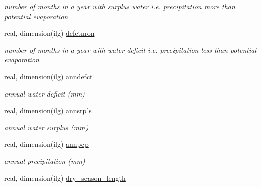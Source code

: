 \begin{DoxyCompactItemize}
\begin{DoxyCompactList}\small\item\em number of months in a year with surplus water i.\+e. precipitation more than potential evaporation \end{DoxyCompactList}\item 
\hypertarget{structctem__statevars_1_1veg__gat_a36f851ca400c9b78f44b675d732a8160}{}real, dimension(ilg) \hyperlink{structctem__statevars_1_1veg__gat_a36f851ca400c9b78f44b675d732a8160}{defctmon}\label{structctem__statevars_1_1veg__gat_a36f851ca400c9b78f44b675d732a8160}

\begin{DoxyCompactList}\small\item\em number of months in a year with water deficit i.\+e. precipitation less than potential evaporation \end{DoxyCompactList}\item 
\hypertarget{structctem__statevars_1_1veg__gat_a1e53f6a1f8f9c68b1e164b30fe833c52}{}real, dimension(ilg) \hyperlink{structctem__statevars_1_1veg__gat_a1e53f6a1f8f9c68b1e164b30fe833c52}{anndefct}\label{structctem__statevars_1_1veg__gat_a1e53f6a1f8f9c68b1e164b30fe833c52}

\begin{DoxyCompactList}\small\item\em annual water deficit (mm) \end{DoxyCompactList}\item 
\hypertarget{structctem__statevars_1_1veg__gat_a78be85930a7e515681ccb43c1d83104c}{}real, dimension(ilg) \hyperlink{structctem__statevars_1_1veg__gat_a78be85930a7e515681ccb43c1d83104c}{annsrpls}\label{structctem__statevars_1_1veg__gat_a78be85930a7e515681ccb43c1d83104c}

\begin{DoxyCompactList}\small\item\em annual water surplus (mm) \end{DoxyCompactList}\item 
\hypertarget{structctem__statevars_1_1veg__gat_a62018a3cba11b41c6568416303b55165}{}real, dimension(ilg) \hyperlink{structctem__statevars_1_1veg__gat_a62018a3cba11b41c6568416303b55165}{annpcp}\label{structctem__statevars_1_1veg__gat_a62018a3cba11b41c6568416303b55165}

\begin{DoxyCompactList}\small\item\em annual precipitation (mm) \end{DoxyCompactList}\item 
\hypertarget{structctem__statevars_1_1veg__gat_ac3e710554e24324b9d749ec9ace55e26}{}real, dimension(ilg) \hyperlink{structctem__statevars_1_1veg__gat_ac3e710554e24324b9d749ec9ace55e26}{dry\+\_\+season\+\_\+length}\label{structctem__statevars_1_1veg__gat_ac3e710554e24324b9d749ec9ace55e26}


\end{DoxyCompactItemize}
